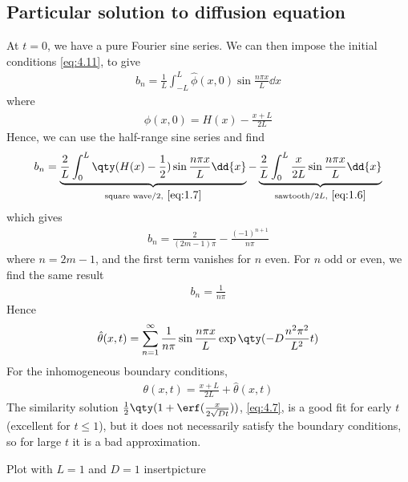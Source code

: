 \subsection{Particular solution to diffusion equation}
At $t = 0$, we have a pure Fourier sine series.
We can then impose the initial conditions \cref{eq:4.11}, to give
\begin{align*}
	b_n = \frac{1}{L} \int_{-L}^L \hat \phi(x,0) \sin \frac{n \pi x}{L} \dd{x}
\end{align*}
where
\begin{align*}
	\hat\phi(x,0) = H(x) - \frac{x+L}{2L}
\end{align*}
Hence, we can use the half-range sine series and find
\begin{align*}
	b_n = \underbrace{ \frac{2}{L} \int_0^L \qty(H(x) - \frac{1}{2}) \sin \frac{n \pi x}{L} \dd{x} }_{\text{square wave}/2, \ \cref{eq:1.7}} - \underbrace{ \frac{2}{L} \int_0^L \frac{x}{2L} \sin \frac{n \pi x}{L} \dd{x} }_{\text{sawtooth}/2L, \ \cref{eq:1.6}}
\end{align*}
which gives
\begin{align*}
	b_n = \frac{2}{(2m-1)\pi} - \frac{(-1)^{n+1}}{n\pi}
\end{align*}
where $n = 2m - 1$, and the first term vanishes for $n$ even.
For $n$ odd or even, we find the same result
\begin{align*}
	b_n = \frac{1}{n\pi}
\end{align*}
Hence
\begin{align*}
	\hat\theta(x,t) = \sum_{n=1}^\infty \frac{1}{n \pi} \sin \frac{n \pi x}{L} \exp\qty(-D \frac{n^2 \pi^2}{L^2} t)
\end{align*}
For the inhomogeneous boundary conditions,
\begin{align} \label{eq:4.14}
	\theta(x,t) = \frac{x+L}{2L} + \hat\theta(x,t)
\end{align}
The similarity solution $\frac{1}{2}\qty(1 + \erf(\frac{x}{2\sqrt{Dt}}))$, \cref{eq:4.7}, is a good fit for early $t$ (excellent for $t \leq 1$), but it does not necessarily satisfy the boundary conditions, so for large $t$ it is a bad approximation.

Plot with $L = 1$ and $D = 1$
insertpicture